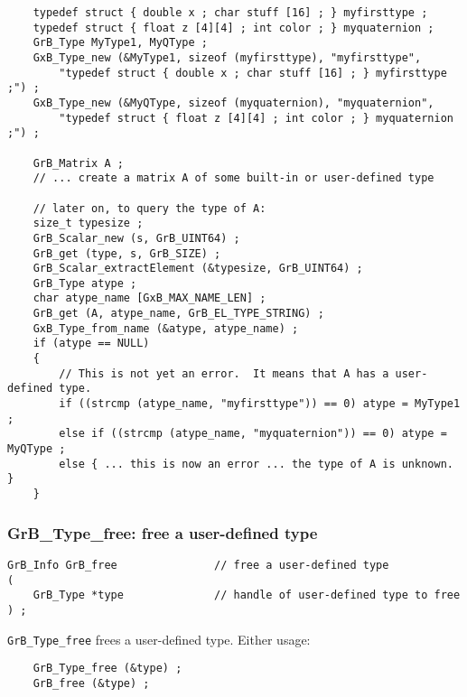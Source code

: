 \documentclass[12pt]{article}
\begin{document}
{\footnotesize
\begin{verbatim}
    typedef struct { double x ; char stuff [16] ; } myfirsttype ;
    typedef struct { float z [4][4] ; int color ; } myquaternion ;
    GrB_Type MyType1, MyQType ;
    GxB_Type_new (&MyType1, sizeof (myfirsttype), "myfirsttype",
        "typedef struct { double x ; char stuff [16] ; } myfirsttype ;") ;
    GxB_Type_new (&MyQType, sizeof (myquaternion), "myquaternion",
        "typedef struct { float z [4][4] ; int color ; } myquaternion ;") ;

    GrB_Matrix A ;
    // ... create a matrix A of some built-in or user-defined type

    // later on, to query the type of A:
    size_t typesize ;
    GrB_Scalar_new (s, GrB_UINT64) ;
    GrB_get (type, s, GrB_SIZE) ;
    GrB_Scalar_extractElement (&typesize, GrB_UINT64) ;
    GrB_Type atype ;
    char atype_name [GxB_MAX_NAME_LEN] ;
    GrB_get (A, atype_name, GrB_EL_TYPE_STRING) ;
    GxB_Type_from_name (&atype, atype_name) ;
    if (atype == NULL)
    {
        // This is not yet an error.  It means that A has a user-defined type.
        if ((strcmp (atype_name, "myfirsttype")) == 0) atype = MyType1 ;
        else if ((strcmp (atype_name, "myquaternion")) == 0) atype = MyQType ;
        else { ... this is now an error ... the type of A is unknown.  }
    }\end{verbatim} }

\subsubsection{{\sf GrB\_Type\_free:} free a user-defined type}
\label{type_free}

\begin{mdframed}[userdefinedwidth=6in]
{\footnotesize
\begin{verbatim}
GrB_Info GrB_free               // free a user-defined type
(
    GrB_Type *type              // handle of user-defined type to free
) ;
\end{verbatim}
}\end{mdframed}

\verb'GrB_Type_free' frees a user-defined type.
Either usage:

    {\small
    \begin{verbatim}
    GrB_Type_free (&type) ;
    GrB_free (&type) ; \end{verbatim}}
\end{document}
